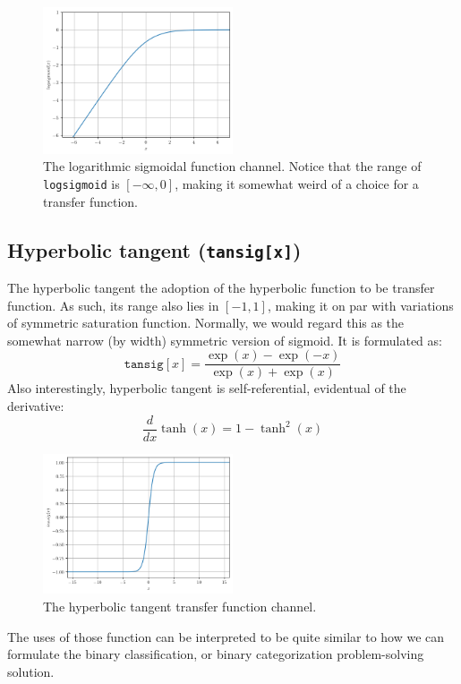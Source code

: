 \begin{figure}[h!]
    \centering
    \includegraphics[width=0.5\textwidth]{img/logsigmoid.png}
    \caption{The logarithmic sigmoidal function channel. Notice that the range of \texttt{logsigmoid} is $[-\infty, 0]$, making it somewhat weird of a choice for a transfer function.}
\end{figure}
\subsection{Hyperbolic tangent (\texttt{tansig[x]})}
The hyperbolic tangent the adoption of the hyperbolic function to be transfer function. As such, its range also lies in $[-1,1]$, making it on par with variations of symmetric saturation function. Normally, we would regard this as the somewhat narrow (by width) symmetric version of sigmoid. It is formulated as: 
\begin{equation}
    \texttt{tansig}[x] = \frac{\exp{(x)} - \exp{(-x)}}{\exp{(x)} + \exp{(x)}}
\end{equation}
Also interestingly, hyperbolic tangent is self-referential, evidentual of the derivative:
\begin{equation*}
    \frac{d}{dx} \tanh{(x)} = 1 - \tanh^{2}{(x)}
\end{equation*}
\begin{figure}[H]
    \centering
    \includegraphics[width=0.5\textwidth]{img/tansig.png}
    \caption{The hyperbolic tangent transfer function channel.}
\end{figure}
The uses of those function can be interpreted to be quite similar to how we can formulate the binary classification, or binary categorization problem-solving solution. 
